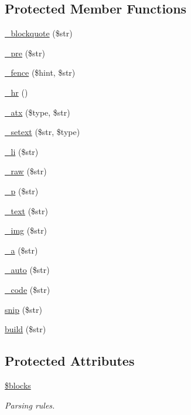 \subsection*{Protected Member Functions}
\begin{DoxyCompactItemize}
\item 
\hyperlink{class_markdown_a9130181ea7718ddb9a253c1c58709e62}{\+\_\+blockquote} (\$str)
\item 
\hyperlink{class_markdown_a2f41e07d6b78f3e9b882bcb34792446d}{\+\_\+pre} (\$str)
\item 
\hyperlink{class_markdown_a18b5eb148af09b928ec07484646f3131}{\+\_\+fence} (\$hint, \$str)
\item 
\hyperlink{class_markdown_a794a9d5fa6b867db9eaecd18fa8394de}{\+\_\+hr} ()
\item 
\hyperlink{class_markdown_a1018c6d4736c90992988a353d3f0edf3}{\+\_\+atx} (\$type, \$str)
\item 
\hyperlink{class_markdown_ad20b6a50b2c1d6b92556755efae0d5ae}{\+\_\+setext} (\$str, \$type)
\item 
\hyperlink{class_markdown_acd211dbc64fbdc856e4abd46670f6993}{\+\_\+li} (\$str)
\item 
\hyperlink{class_markdown_aa1fa1fb7287331de41bc0c75fa349afa}{\+\_\+raw} (\$str)
\item 
\hyperlink{class_markdown_a82a2bccde5a674e56ab6c6c3be76273c}{\+\_\+p} (\$str)
\item 
\hyperlink{class_markdown_a11f2b2c375b61a22398e08bdb95aa4b6}{\+\_\+text} (\$str)
\item 
\hyperlink{class_markdown_a29692127c6b62aed5fba05bc7d2aba5f}{\+\_\+img} (\$str)
\item 
\hyperlink{class_markdown_a65692f4b6b15029d6e26a80db9e4748c}{\+\_\+a} (\$str)
\item 
\hyperlink{class_markdown_ad228c71c9aae197fda9b32413b63e605}{\+\_\+auto} (\$str)
\item 
\hyperlink{class_markdown_a8cd84bea585e81d80e4dfb8836922e54}{\+\_\+code} (\$str)
\item 
\hyperlink{class_markdown_aa662980c0756e03123234999df984f02}{snip} (\$str)
\item 
\hyperlink{class_markdown_aeafac9b9cffe924ba0f859a6bfb8aa85}{build} (\$str)
\end{DoxyCompactItemize}
\subsection*{Protected Attributes}
\begin{DoxyCompactItemize}
\item 
\hypertarget{class_markdown_a320aeae1df42ee73ab4b3d9f7cf4ef3f}{}\label{class_markdown_a320aeae1df42ee73ab4b3d9f7cf4ef3f} 
\hyperlink{class_markdown_a320aeae1df42ee73ab4b3d9f7cf4ef3f}{\$blocks}
\begin{DoxyCompactList}\small\item\em Parsing rules. \end{DoxyCompactList}\end{DoxyCompactItemize}
